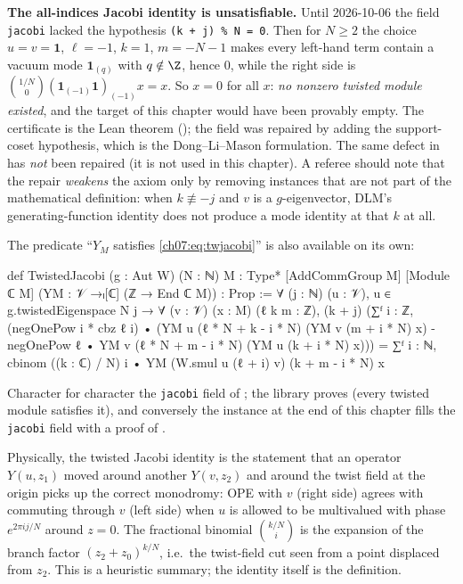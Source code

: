 \begin{warning}
\textbf{The all-indices Jacobi identity is unsatisfiable.} Until 2026-10-06 the field
\verb|jacobi| lacked the hypothesis \verb|(k + j) % N = 0|. Then for $N\ge2$ the choice
$u=v=\mathbf 1$, $\ell=-1$, $k=1$, $m=-N-1$ makes every left-hand term contain a vacuum mode
$\mathbf 1_{(q)}$ with $q\notin\Z$, hence $0$, while the right side is
$\binom{1/N}{0}(\mathbf 1_{(-1)}\mathbf 1)_{(-1)}x = x$. So $x=0$ for all $x$: \emph{no nonzero
twisted module existed}, and the target of this chapter would have been provably empty. The
certificate is the Lean theorem 
(); the field was repaired by adding
the support-coset hypothesis, which is the Dong--Li--Mason formulation. The same defect in
 has \emph{not} been repaired (it is not used in this chapter).
A referee should note that the repair \emph{weakens} the axiom only by removing instances that
are not part of the mathematical definition: when $k\not\equiv -j$ and $v$ is a $g$-eigenvector,
DLM's generating-function identity does not produce a mode identity at that $k$ at all.
\end{warning}

The predicate ``$Y_M$ satisfies \eqref{ch07:eq:twjacobi}'' is also available on its own:

\begin{leancode}
def TwistedJacobi (g : Aut W) (N : ℕ) {M : Type*} [AddCommGroup M] [Module ℂ M]
    (YM : 𝒱 →ₗ[ℂ] (ℤ → End ℂ M)) : Prop :=
  ∀ (j : ℕ) (u : 𝒱), u ∈ g.twistedEigenspace N j → ∀ (v : 𝒱) (x : M) (ℓ k m : ℤ),
    (k + j) %
    (∑ᶠ i : ℤ, (negOnePow i * cbz ℓ i) •
        (YM u (ℓ * N + k - i * N) (YM v (m + i * N) x)
          - negOnePow ℓ • YM v (ℓ * N + m - i * N) (YM u (k + i * N) x)))
      = ∑ᶠ i : ℕ, cbinom ((k : ℂ) / N) i • YM (W.smul u (ℓ + i) v) (k + m - i * N) x
\end{leancode}

\begin{dictionary}
Character for character the \verb|jacobi| field of ; the library proves
 (every twisted module satisfies it), and conversely the
instance at the end of this chapter fills the \verb|jacobi| field with a proof of
.
\end{dictionary}

\begin{physics}
Physically, the twisted Jacobi identity is the statement that an operator $Y(u,z_1)$ moved around another $Y(v,z_2)$ and around the twist field at the origin picks up the correct monodromy: OPE with $v$ (right side) agrees with commuting through $v$ (left side) when $u$ is allowed to be multivalued with phase $e^{2\pi i j/N}$ around $z=0$. The fractional binomial $\binom{k/N}{i}$ is the expansion of the branch factor $(z_2+z_0)^{k/N}$, i.e.\ the twist-field cut seen from a point displaced from $z_2$. This is a heuristic summary; the identity itself is the definition.
\end{physics}

